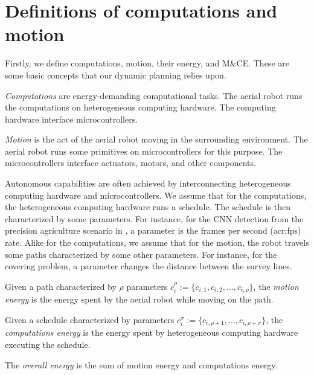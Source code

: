 \section{Definitions of computations and motion}
\label{sec:definitions}

Firstly, we define computations, motion, their energy, and M\&CE. These are some basic concepts that our dynamic planning relies upon.

\begin{highlight}
  \begin{defn}\label{def:comps}
    \emph{Computations} are energy-demanding computational tasks. The aerial robot runs the computations on heterogeneous computing hardware. The computing hardware interface microcontrollers.
    
    \emph{Motion} is the act of the aerial robot moving in the surrounding environment. The aerial robot runs some primitives on microcontrollers for this purpose. The microcontrollers interface actuators, motors, and other components.
  \end{defn}
\end{highlight}

Autonomous capabilities are often achieved by interconnecting heterogeneous computing hardware and microcontrollers. We assume that for the computations, the heterogeneous computing hardware runs a schedule. The schedule is then characterized by some parameters. For instance, for the CNN detection from the precision agriculture scenario in , a parameter is the frames per second (\Gls{acr:fps}) rate. Alike for the computations, we assume that for the motion, the robot travels some paths characterized by some other parameters. For instance, for the covering problem, a parameter changes the distance between the survey lines.

\begin{highlight}
\begin{defn}\label{def:comp-mot-energy}
  Given a path characterized by $\rho$ parameters $c_i^\rho:=\{c_{i,1},c_{i,2},\dots,c_{i,\rho}\}$, the \emph{motion energy} is the energy spent by the aerial robot while moving on the path.

  Given a schedule characterized by parameters $c_i^\sigma:=\{c_{i,\rho+1},\dots,c_{i,\rho+\sigma}\}$, the \emph{computations energy} is the energy spent by heterogeneous computing hardware executing the schedule.

  The \emph{overall energy} is the sum of motion energy and computations energy.
\end{defn}
\end{highlight}

